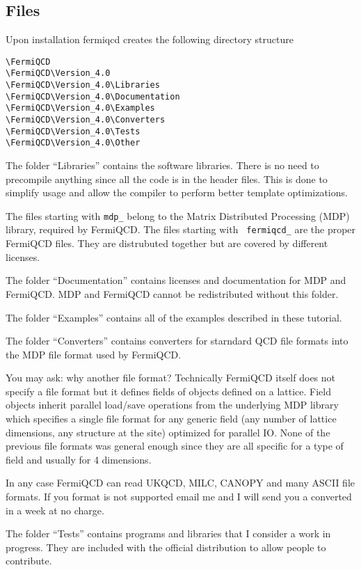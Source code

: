 \subsection{Files}

Upon installation fermiqcd creates the following directory structure
\begin{verbatim}
\FermiQCD
\FermiQCD\Version_4.0
\FermiQCD\Version_4.0\Libraries
\FermiQCD\Version_4.0\Documentation
\FermiQCD\Version_4.0\Examples
\FermiQCD\Version_4.0\Converters
\FermiQCD\Version_4.0\Tests
\FermiQCD\Version_4.0\Other
\end{verbatim}

The folder ``Libraries'' contains the software libraries. There is no need
to precompile anything since all the code is in the header files. This is
done to simplify usage and allow the compiler to perform better template
optimizations.

The files starting with {\tt mdp\_} belong to the Matrix Distributed
Processing (MDP) library, required by FermiQCD. The files starting with {\tt %
fermiqcd\_} are the proper FermiQCD files. They are distrubuted together but
are covered by different licenses. 

The folder ``Documentation'' contains licenses and documentation for MDP and
FermiQCD. MDP and FermiQCD cannot be redistributed without this folder.

The folder ``Examples'' contains all of the examples described in these
tutorial.

The folder ``Converters'' contains converters for starndard QCD file formats
into the MDP file format used by FermiQCD. 

You may ask: why another file format? Technically FermiQCD itself does not
specify a file format but it defines fields of objects defined on a lattice.
Field objects inherit parallel load/save operations from the underlying MDP
library which specifies a single file format for any generic field (any
number of lattice dimensions, any structure at the site) optimized for
parallel IO. None of the previous file formats was general enough since they
are all specific for a type of field and usually for 4 dimensions.

In any case FermiQCD can read UKQCD, MILC, CANOPY and many ASCII file
formats. If you format is not supported email me and I will send you a
converted in a week at no charge.

The folder ``Tests'' contains programs and libraries that I consider a work
in progress. They are included with the official distribution to allow
people to contribute.

